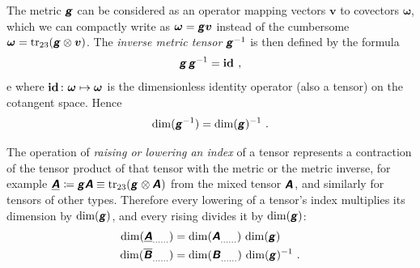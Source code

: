 \documentclass[\ifafour a4paper,12pt,\else a5paper,10pt,\fi%
onecolumn,oneside,article,%
british%
]{memoir}
\makeatletter
\theoremstyle{remark}
\theoremstyle{innote}
\newcommand*{\mathte}[1]{\textbf{\textit{\textsf{#1}}}}
\DeclareMathOperator{\tr}{tr}%
\newcommand*{\defd}{\coloneqq}
\renewcommand*{\|}[1][]{\nonscript\,#1\vert\nonscript\;\mathopen{}}
\newcommand*{\q}{}%
\DeclareRobustCommand*{\q}{%
  \mathbin{\mathpalette\bigcdot@{}}%
}
\newcommand*{\bigcdot@scalefactor}{0.7}
\newcommand*{\bigcdot@widthfactor}{1.5}
\newcommand*{\bigcdot@}[2]{%
  \sbox0{$#1\vcenter{}$}%
  \sbox2{$#1\cdot\m@th$}%
  \hbox to \bigcdot@widthfactor\wd2{%
    \hfil
    \raise\ht0\hbox{%
      \scalebox{\bigcdot@scalefactor}{%
        \lower\ht0\hbox{$#1\bullet\m@th$}%
      }%
    }%
    \hfil
  }%
}
\newcommand*{\Un}{\textsf{1}}
\newcommand*{\Le}{\textsf{L}}
\newcommand*{\Ti}{\textsf{T}}
\newcommand*{\yA}{\mathte{A}}
\newcommand*{\yAg}{\underline{\yA}}
\newcommand*{\yB}{\mathte{B}}
\newcommand*{\yBg}{\overline{\yB}}
\newcommand*{\yg}{\mathte{g}}
\newcommand*{\yom}{\bm{\omega}}
\newcommand*{\yv}{\bm{v}}
\renewcommand*{\i}{\indices}
\newcommand*{\id}{\mathbf{id}}%
\makeatother
\begin{document}
\medskip

The metric $\yg$ can be considered as an operator mapping vectors $\yv$ to
covectors $\yom$, which we can compactly write as $\yom=\yg\yv$ instead of the
cumbersome $\yom = \tr_{23}(\yg\otimes\yv)$. The \emph{inverse metric
  tensor} $\yg\i{^{-1}^{\q\q}}$ is then defined by the formula
\begin{equation}
  \label{eq:inverse_g}
  \yg\,\yg^{-1} = \id\i{_{\q}^{\q}} \ ,
\end{equation}e
where $\id\i{_{\q}^{\q}}\colon \yom \mapsto \yom$ is the dimensionless
identity operator (also a tensor) on the cotangent space. Hence
\begin{equation}
  \label{eq:dim_ig}
  \dim(\yg^{-1}) = \dim(\yg)^{-1} \ .
\end{equation}

\medskip

The operation of \emph{raising or lowering an index} of a tensor represents
a contraction of the tensor product of that tensor with the metric or the
metric inverse, for example
$\yAg\i{_{\q\q}} \defd \yg\yA \equiv \tr_{23}(\yg\i{_{\q\q}} \otimes
\yA\i{^{\q}_{\q}})$ from the mixed tensor $\yA\i{^{\q}_{\q}}$, and
similarly for tensors of other types. Therefore every lowering of a
tensor's index multiplies its dimension by $\dim(\yg)$, and every rising
divides it by $\dim(\yg)$:
\begin{equation}
  \label{eq:raising_lowering}
  \begin{split}
  \dim(\yAg\i{_{\dotso}_{\q}_{\dotso}}) &=
  \dim(\yA\i{_{\dotso}^{\q}_{\dotso}})\,\dim(\yg)
\\
  \dim(\yBg\i{_{\dotso}^{\q}_{\dotso}}) &=
  \dim(\yB\i{_{\dotso}_{\q}_{\dotso}})\,\dim(\yg)^{-1} \ .
\end{split}
\end{equation}

\medskip
\end{document}

